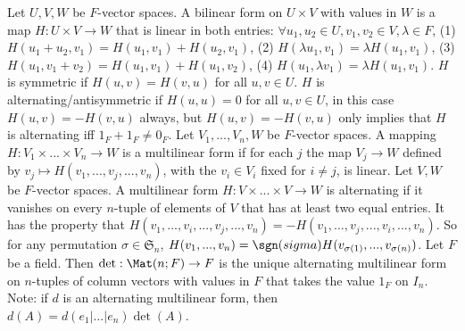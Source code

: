 Let $U, V, W$ be $F$-vector spaces.
A bilinear form on $U \times V$ with values in $W$ is a map $H : U \times V \to W$ that is linear in both entries:
$\forall u_1, u_2 \in U, v_1, v_2 \in V, \lambda \in F$,
(1) $H(u_1 + u_2, v_1) = H(u_1, v_1) + H(u_2, v_1)$,
(2) $H(\lambda u_1, v_1) = \lambda H(u_1, v_1)$,
(3) $H(u_1, v_1 + v_2) = H(u_1, v_1) + H(u_1, v_2)$,
(4) $H(u_1, \lambda v_1) = \lambda H(u_1, v_1)$.
$H$ is symmetric if $H(u, v) = H(v, u)$ for all $u, v \in U$.
$H$ is alternating/antisymmetric if $H(u,u) = 0$ for all $u, v \in U$,
in this case $H(u, v) = -H(v, u)$ always,
but $H(u, v) = -H(v, u)$ only implies that $H$ is alternating iff $1_F + 1_F \neq 0_F$.
Let $V_1, ..., V_n, W$ be $F$-vector spaces.
A mapping $H: V_1 \times ... \times V_n \to W$ is a multilinear form if
for each $j$ the map $V_j \to W$
defined by $v_j \mapsto H(v_1, ..., v_j, ..., v_n)$,
with the $v_i \in V_i$ fixed for $i \neq j$, is linear.
 Let $V, W$ be $F$-vector spaces.
A multilinear form $H : V \times ... \times V \to W$ is alternating if
it vanishes on every $n$-tuple of elements of $V$ that has at least two equal entries.
It has the property that $H(v_1, ..., v_i, ..., v_j, ..., v_n) = -H(v_1, ..., v_j, ..., v_i, ..., v_n)$.
So for any permutation $\sigma \in \mathfrak{S}_n$,
$H(v_1, ..., v_n) = \sgn(sigma) H(v_{\sigma(1)}, ..., v_{\sigma(n)})$.
Let $F$ be a field.
Then $\det : \Mat(n; F) \to F$ is the unique alternating multilinear form
on $n$-tuples of column vectors with values in $F$
that takes the value $1_F$ on $I_n$.
Note: if $d$ is an alternating multilinear form, then $d(A) = d(e_1|...|e_n)\det(A)$.